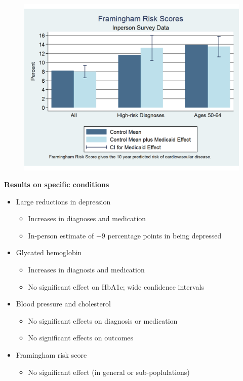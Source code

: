 \documentclass[notes=show]{beamer}
\begin{document}
\begin{frame}[plain]
	
	\begin{figure}
	\includegraphics[scale=0.40]{./lecture_includes/baicker_17.pdf}
	\end{figure}
\end{frame}

\begin{frame}[plain]
	\begin{center}
	\textbf{Results on specific conditions}
	\end{center}
	
	\begin{itemize}
	\item Large reductions in depression
		\begin{itemize}
		\item Increases in diagnoses and medication
		\item In-person estimate of $-9$ percentage points in being depressed
		\end{itemize}
	\item Glycated hemoglobin
		\begin{itemize}
		\item Increases in diagnosis and medication
		\item No significant effect on HbA1c; wide confidence intervals
		\end{itemize}
	\item Blood pressure and cholesterol
		\begin{itemize}
		\item No significant effects on diagnosis or medication
		\item No significant effects on outcomes
		\end{itemize}
	\item Framingham risk score
		\begin{itemize}
		\item No significant effect (in general or sub-poplulations)
		\end{itemize}
	\end{itemize}
\end{frame}
\end{document}
